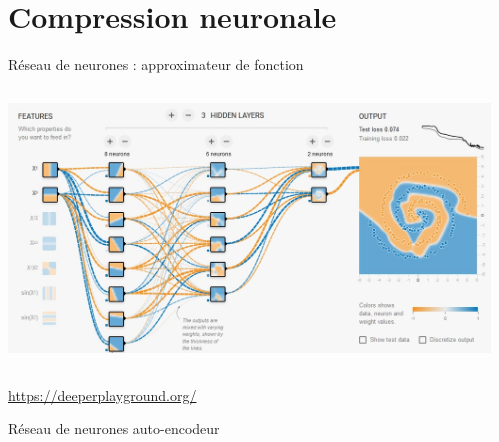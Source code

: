 \documentclass[9pt, aspectratio=169]{beamer}
\begin{document}
\section{Compression neuronale}

\begin{frame}{} %
\begin{center}
\Huge \insertsection
\end{center}
\end{frame}

\begin{frame}{Réseau de neurones : approximateur de fonction} %
\begin{columns}
   \begin{column}{0.48\textwidth}
		\includegraphics[width=\textwidth]{fig/deeperplayground.jpg}
   \end{column}
   \begin{column}{0.48\textwidth}
   \end{column}
\end{columns}
\url{https://deeperplayground.org/}
\end{frame}

\begin{frame}{Réseau de neurones auto-encodeur} %
\begin{columns}
   \begin{column}{0.48\textwidth}
   \end{column}
   \begin{column}{0.48\textwidth}
   \end{column}
\end{columns}
\end{frame}
\end{document}
